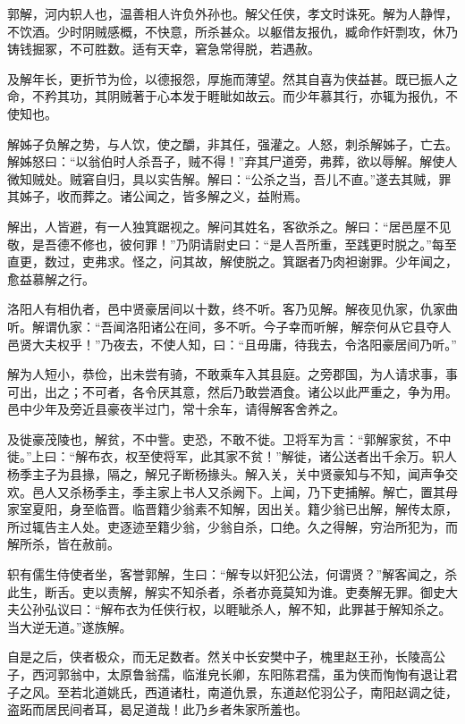 \documentclass[]{article}
\begin{document}
郭解，河内轵人也，温善相人许负外孙也。解父任侠，孝文时诛死。解为人静悍，不饮酒。少时阴贼感概，不快意，所杀甚众。以躯借友报仇，臧命作奸剽攻，休乃铸钱掘冢，不可胜数。适有天幸，窘急常得脱，若遇赦。

及解年长，更折节为俭，以德报怨，厚施而薄望。然其自喜为侠益甚。既已振人之命，不矜其功，其阴贼著于心本发于睚眦如故云。而少年慕其行，亦辄为报仇，不使知也。

解姊子负解之势，与人饮，使之釂，非其任，强灌之。人怒，刺杀解姊子，亡去。解姊怒曰：``以翁伯时人杀吾子，贼不得！''弃其尸道旁，弗葬，欲以辱解。解使人微知贼处。贼窘自归，具以实告解。解曰：``公杀之当，吾儿不直。''遂去其贼，罪其姊子，收而葬之。诸公闻之，皆多解之义，益附焉。

解出，人皆避，有一人独箕踞视之。解问其姓名，客欲杀之。解曰：``居邑屋不见敬，是吾德不修也，彼何罪！''乃阴请尉史曰：``是人吾所重，至践更时脱之。''每至直更，数过，吏弗求。怪之，问其故，解使脱之。箕踞者乃肉袒谢罪。少年闻之，愈益慕解之行。

洛阳人有相仇者，邑中贤豪居间以十数，终不听。客乃见解。解夜见仇家，仇家曲听。解谓仇家：``吾闻洛阳诸公在间，多不听。今子幸而听解，解奈何从它县夺人邑贤大夫权乎！''乃夜去，不使人知，曰：``且毋庸，待我去，令洛阳豪居间乃听。''

解为人短小，恭俭，出未尝有骑，不敢乘车入其县庭。之旁郡国，为人请求事，事可出，出之；不可者，各令厌其意，然后乃敢尝酒食。诸公以此严重之，争为用。邑中少年及旁近县豪夜半过门，常十余车，请得解客舍养之。

及徙豪茂陵也，解贫，不中訾。吏恐，不敢不徙。卫将军为言：``郭解家贫，不中徙。''上曰：``解布衣，权至使将军，此其家不贫！''解徙，诸公送者出千余万。轵人杨季主子为县掾，隔之，解兄子断杨掾头。解入关，关中贤豪知与不知，闻声争交欢。邑人又杀杨季主，季主家上书人又杀阙下。上闻，乃下吏捕解。解亡，置其母家室夏阳，身至临晋。临晋籍少翁素不知解，因出关。籍少翁已出解，解传太原，所过辄告主人处。吏逐迹至籍少翁，少翁自杀，口绝。久之得解，穷治所犯为，而解所杀，皆在赦前。

轵有儒生侍使者坐，客誉郭解，生曰：``解专以奸犯公法，何谓贤？''解客闻之，杀此生，断舌。吏以责解，解实不知杀者，杀者亦竟莫知为谁。吏奏解无罪。御史大夫公孙弘议曰：``解布衣为任侠行权，以睚眦杀人，解不知，此罪甚于解知杀之。当大逆无道。''遂族解。

自是之后，侠者极众，而无足数者。然关中长安樊中子，槐里赵王孙，长陵高公子，西河郭翁中，太原鲁翁孺，临淮皃长卿，东阳陈君孺，虽为侠而恂恂有退让君子之风。至若北道姚氏，西道诸杜，南道仇景，东道赵佗羽公子，南阳赵调之徒，盗跖而居民间者耳，曷足道哉！此乃乡者朱家所羞也。
\end{document}
